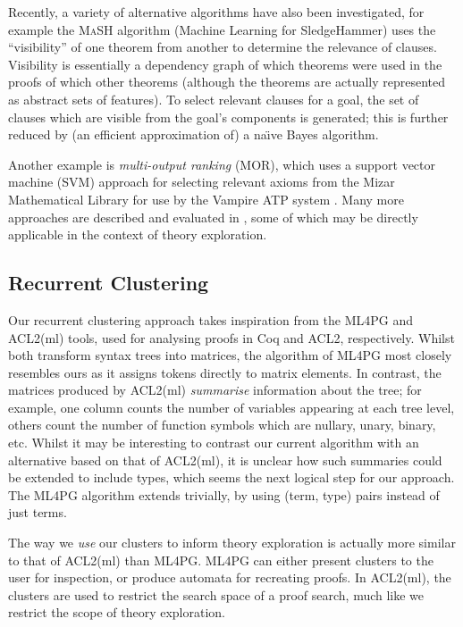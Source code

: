 Recently, a variety of alternative algorithms have also been investigated, for example the \textsc{MaSH} algorithm (Machine Learning for SledgeHammer) \citep{kuhlwein2013mash} uses the ``visibility'' of one theorem from another to determine the relevance of clauses. Visibility is essentially a dependency graph of which theorems were used in the proofs of which other theorems (although the theorems are actually represented as abstract sets of features). To select relevant clauses for a goal, the set of clauses which are visible from the goal's components is generated; this is further reduced by (an efficient approximation of) a na\"{\i}ve Bayes algorithm.

Another example is \emph{multi-output ranking} (MOR), which uses a support vector machine (SVM) approach for selecting relevant axioms from the Mizar Mathematical Library for use by the Vampire ATP system \citep{alama2014premise}. Many more approaches are described and evaluated in \citep{kuhlwein2012overview}, some of which may be directly applicable in the context of theory exploration.

\subsection{Recurrent Clustering}
\label{sec:clusteringexpressions}

Our recurrent clustering approach takes inspiration from the ML4PG \citep{journals/corr/abs-1212-3618} and ACL2(ml) \citep{heras2013proof} tools, used for analysing proofs in Coq and ACL2, respectively. Whilst both transform syntax trees into matrices, the algorithm of ML4PG most closely resembles ours as it assigns tokens directly to matrix elements. In contrast, the matrices produced by ACL2(ml) \emph{summarise} information about the tree; for example, one column counts the number of variables appearing at each tree level, others count the number of function symbols which are nullary, unary, binary, etc. Whilst it may be interesting to contrast our current algorithm with an alternative based on that of ACL2(ml), it is unclear how such summaries could be extended to include types, which seems the next logical step for our approach. The ML4PG algorithm extends trivially, by using (term, type) pairs instead of just terms.

The way we \emph{use} our clusters to inform theory exploration is actually more similar to that of ACL2(ml) than ML4PG. ML4PG can either present clusters to the user for inspection, or produce automata for recreating proofs. In ACL2(ml), the clusters are used to restrict the search space of a proof search, much like we restrict the scope of theory exploration.

